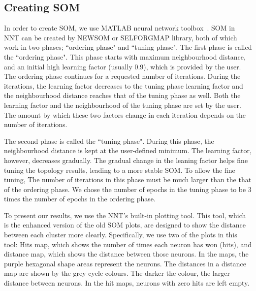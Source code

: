 \subsection{Creating SOM}
\label{sec: create_som}
     In order to create SOM, we use {\tiny MATLAB} neural network toolbox~\citep[NNT,][]{matlabtolbox}.
     SOM in {\tiny NNT} can be created by {\tiny NEWSOM} or {\tiny SELFORGMAP} library, both of which work in two phases; ``ordering phase" and ``tuning phase". 
     The first phase is called the ``ordering phase". 
     This phase starts with maximum neighbourhood distance, and an initial high learning factor (usually 0.9), which is provided by the user. 
     The ordering phase continues for a requested number of iterations.
     During the iterations, the learning factor decreases to the tuning phase learning factor and the neighbourhood distance reaches that of the tuning phase as well.
     Both the learning factor and the neighbourhood of the tuning phase are set by the user. 
     The amount by which these two factors change in each iteration depends on the number of iterations.
     
     The second phase is called the ``tuning phase".
     During this phase, the neighbourhood distance is kept at the user-defined minimum.
     The learning factor, however, decreases gradually.
     The gradual change in the leaning factor helps fine tuning the topology results, leading to a more stable SOM. 
     To allow the fine tuning, The number of iterations in this phase must be much larger than the that of the ordering phase. %
     We chose the number of epochs in the tuning phase to be 3 times the number of epochs in the ordering phase.
     
     To present our results, we use the {\tiny NNT}'s built-in plotting tool.
     This tool, which is the enhanced version of the old SOM plots, are designed to show the distance between each cluster more clearly.
     Specifically, we use two of the plots in this tool: Hits map, which shows the number of times each neuron has won (hits), and distance map, which shows the distance between those neurons.
     In the maps, the purple hexagonal shape areas represent the neurons.
     The distances in a distance map are shown by the grey cycle colours.
     The darker the colour, the larger distance between neurons.
     In the hit maps, neurons with zero hits are left empty.
      
